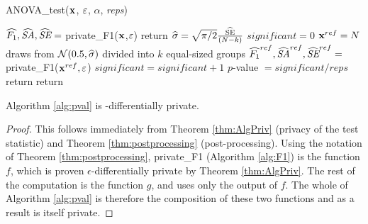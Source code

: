 \begin{algorithm}
    \caption{ANOVA\_test($\mathbf{x}$, $\varepsilon$, $\alpha$, \emph{reps})\label{alg:pval} }
    \begin{algorithmic}
        \STATE $\widehat{F_1}, \widehat{\textit{SA}}, \widehat{\textit{SE}} =$ private\_F1($\mathbf{x}$,$\varepsilon$)
        \STATE return 
        \ENDIF
        \STATE $\widehat{\sigma} = \sqrt{\pi/2}\frac{\widehat{\text{SE}}}{(N-k)}$
        \STATE $significant = 0$
        \STATE  $\mathbf{x}^{ref} = N$ draws from $\mathcal{N}(0.5, \widehat{\sigma})$ divided into $k$ equal-sized groups
        \STATE $\widehat{F_1}^{ref}, \widehat{\textit{SA}}^{ref}, \widehat{\textit{SE}}^{ref} =$ private\_F1($\mathbf{x}^{ref}, \varepsilon$)
        \STATE $significant = significant + 1$
        \ENDIF
        \ENDFOR
        \STATE $p$-value $= significant/reps$
        \STATE return 
        \ELSE 
        \STATE return 
        \ENDIF
    \end{algorithmic}
\end{algorithm}


\begin{theorem} \label{thm:fullTestPriv}
Algorithm \ref{alg:pval} is \eps-differentially private.
\end{theorem}
\begin{proof}
This follows immediately from Theorem \ref{thm:AlgPriv} (privacy of the test statistic) and Theorem \ref{thm:postprocessing} (post-processing).  Using the notation of Theorem \ref{thm:postprocessing}, private\_F1 (Algorithm \ref{alg:F1}) is the function $f$, which is proven $\epsilon$-differentially private by Theorem \ref{thm:AlgPriv}.  The rest of the computation is the function $g$, and uses only the output of $f$.  The whole of Algorithm \ref{alg:pval} is therefore the composition of these two functions and as a result is itself private.
\end{proof}



